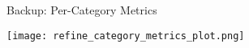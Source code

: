 \begin{frame}{Backup: Per-Category Metrics}

\begin{center}
  \texttt{[image: refine\_category\_metrics\_plot.png]}
\end{center}

\end{frame}
